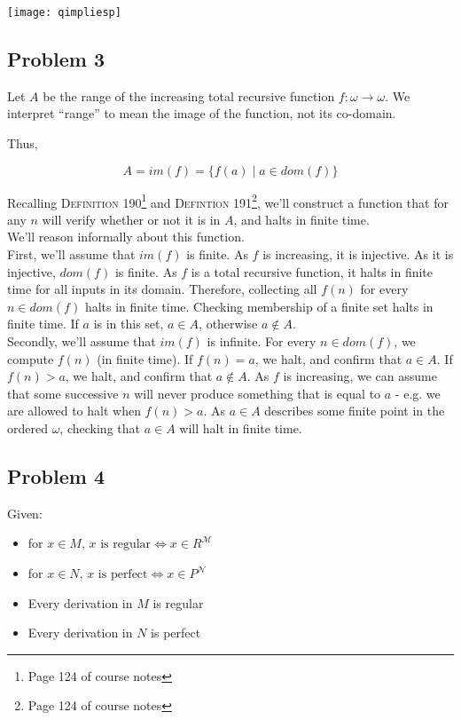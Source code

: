\documentclass[a4paper]{article}
\newcommand{\SET}[1]{\{ {#1} \}}
\begin{document}
    \texttt{[image: qimpliesp]}

\subsection*{Problem 3}

Let $A$ be the range of the increasing total recursive function $f: \omega \rightarrow \omega$. We interpret ``range'' to mean the image of the function, not its co-domain.

Thus,

\[
    A = im(f) = \SET{ f(a) \mid a \in dom(f) }
\]

Recalling \textsc{Definition 190}\footnote{Page 124 of course notes} and \textsc{Defintion 191}\footnote{Page 124 of course notes}, we'll construct a function that for any $n$ will verify whether or not it is in $A$, and halts in finite time. \\

We'll reason informally about this function.\\

First, we'll assume that $im(f)$ is finite. As $f$ is increasing, it is injective. As it is injective, $dom(f)$ is finite. As $f$ is a total recursive function, it halts in finite time for all inputs in its domain. Therefore, collecting all $f(n)$ for every $n \in dom(f)$ halts in finite time. Checking membership of a finite set halts in finite time. If $a$ is in this set, $a \in A$, otherwise $a \not\in A$.\\

Secondly, we'll assume that $im(f)$ is infinite. For every $n \in dom(f)$, we compute $f(n)$ (in finite time). If $f(n) = a$, we halt, and confirm that $a \in A$. If $f(n) > a$, we halt, and confirm that $a \not\in A$. As $f$ is increasing, we can assume that some successive $n$ will never produce something that is equal to $a$ - e.g. we are allowed to halt when $f(n) > a$. As $a \in A$ describes some finite point in the ordered $\omega$, checking that $a \in A$ will halt in finite time.


\subsection*{Problem 4}

Given:

\begin{itemize}
    \item for $x \in M$, $x \text{ is regular} \Leftrightarrow x \in R^{\mathcal{M}}$
    \item for $x \in N$, $x \text{ is perfect} \Leftrightarrow x \in P^{\mathcal{N}}$
    \item Every derivation in $M$ is regular
    \item Every derivation in $N$ is perfect
\end{itemize}
\end{document}

